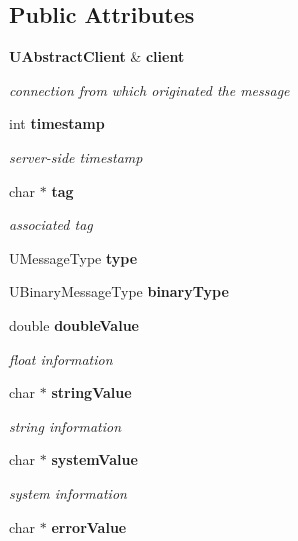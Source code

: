 \subsection*{Public Attributes}
\begin{CompactItemize}
\item 
{\bf UAbstract\-Client} \& {\bf client}\label{classUMessage_o0}

\begin{CompactList}\small\item\em connection from which originated the message \item\end{CompactList}\item 
int {\bf timestamp}\label{classUMessage_o1}

\begin{CompactList}\small\item\em server-side timestamp \item\end{CompactList}\item 
char $\ast$ {\bf tag}\label{classUMessage_o2}

\begin{CompactList}\small\item\em associated tag \item\end{CompactList}\item 
UMessage\-Type {\bf type}\label{classUMessage_o3}

\item 
UBinary\-Message\-Type {\bf binary\-Type}\label{classUMessage_o4}

\item 
double {\bf double\-Value}\label{classUMessage_o5}

\begin{CompactList}\small\item\em float information \item\end{CompactList}\item 
char $\ast$ {\bf string\-Value}\label{classUMessage_o6}

\begin{CompactList}\small\item\em string information \item\end{CompactList}\item 
char $\ast$ {\bf system\-Value}\label{classUMessage_o7}

\begin{CompactList}\small\item\em system information \item\end{CompactList}\item 
char $\ast$ {\bf error\-Value}\label{classUMessage_o8}


\end{CompactItemize}
